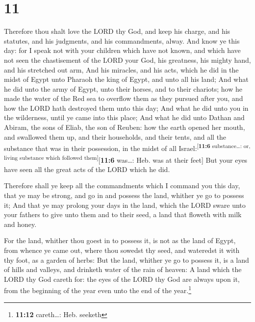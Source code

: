 \hypertarget{section-10}{%
\section{11}\label{section-10}}

 Therefore thou shalt love the LORD thy God, and keep his
charge, and his statutes, and his judgments, and his commandments,
alway.  And know ye this day: for I speak not with your
children which have not known, and which have not seen the chastisement
of the LORD your God, his greatness, his mighty hand, and his stretched
out arm,  And his miracles, and his acts, which he did in
the midst of Egypt unto Pharaoh the king of Egypt, and unto all his
land;  And what he did unto the army of Egypt, unto their
horses, and to their chariots; how he made the water of the Red sea to
overflow them as they pursued after you, and how the LORD hath destroyed
them unto this day;  And what he did unto you in the
wilderness, until ye came into this place;  And what he
did unto Dathan and Abiram, the sons of Eliab, the son of Reuben: how
the earth opened her mouth, and swallowed them up, and their households,
and their tents, and all the substance that was in their possession, in
the midst of all Israel:\textsuperscript{{[}\textbf{11:6}
substance\ldots: or, living substance which followed
them{]}}{[}\textbf{11:6} was\ldots: Heb. was at their feet{]}
 But your eyes have seen all the great acts of the LORD
which he did.

 Therefore shall ye keep all the commandments which I
command you this day, that ye may be strong, and go in and possess the
land, whither ye go to possess it;  And that ye may
prolong your days in the land, which the LORD sware unto your fathers to
give unto them and to their seed, a land that floweth with milk and
honey.

 For the land, whither thou goest in to possess it, is
not as the land of Egypt, from whence ye came out, where thou sowedst
thy seed, and wateredst it with thy foot, as a garden of herbs:
 But the land, whither ye go to possess it, is a land of
hills and valleys, and drinketh water of the rain of heaven:
 A land which the LORD thy God careth for: the eyes of
the LORD thy God are always upon it, from the beginning of the year even
unto the end of the year.\footnote{\textbf{11:12} careth\ldots: Heb.
  seeketh}

